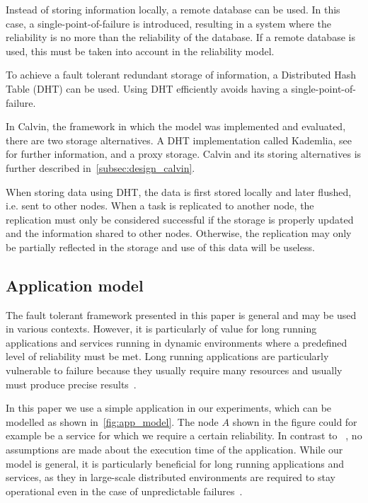 \documentclass{cslthse-msc}
\begin{document}
Instead of storing information locally, a remote database can be used. In this case, a single-point-of-failure is introduced, resulting in a system where the reliability is no more than the reliability of the database. If a remote database is used, this must be taken into account in the reliability model.

To achieve a fault tolerant redundant storage of information, a Distributed Hash Table (DHT) can be used. Using DHT efficiently avoids having a single-point-of-failure. 

In Calvin, the framework in which the model was implemented and evaluated, there are two storage alternatives. A DHT implementation called Kademlia, see~\cite{kademlia} for further information, and a proxy storage. Calvin and its storing alternatives is further described in~\cref{subsec:design_calvin}.

When storing data using DHT, the data is first stored locally and later flushed, i.e. sent to other nodes. When a task is replicated to another node, the replication must only be considered successful if the storage is properly updated and the information shared to other nodes. Otherwise, the replication may only be partially reflected in the storage and use of this data will be useless. 

\subsection{Application model} \label{subsec:design_app_model}
The fault tolerant framework presented in this paper is general and may be used in various contexts. However, it is particularly of value for long running applications and services running in dynamic environments where a predefined level of reliability must be met. Long running applications are particularly vulnerable to failure because they usually require many resources and usually must produce precise results~\cite{relGridSystems}.

In this paper we use a simple application in our experiments, which can be modelled as shown in~\cref{fig:app_model}. The node $A$ shown in the figure could for example be a service for which we require a certain reliability. In contrast to ~\cite{algoOptTimeMaxRel, optTaskAllocationForMaxRel, taskAllocation, taskAllocationSwarm, algoMaxRelEndToEndConstraint, algoMinExTime, schedReplicas}, no assumptions are made about the execution time of the application. While our model is general, it is particularly beneficial for long running applications and services, as they in large-scale distributed environments are required to stay operational even in the case of unpredictable failures~\cite{imprRelAdaptRL}.
\end{document}
